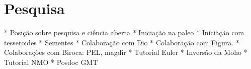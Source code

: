 \section{Pesquisa}

* Posição sobre pesquisa e ciência aberta
* Iniciação na paleo
* Iniciação com tesseroides
* Sementes
* Colaboração com Dio
* Colaboração com Figura.
* Colaborações com Biroca: PEL, magdir
* Tutorial Euler
* Inversão da Moho
* Tutorial NMO
* Posdoc GMT
